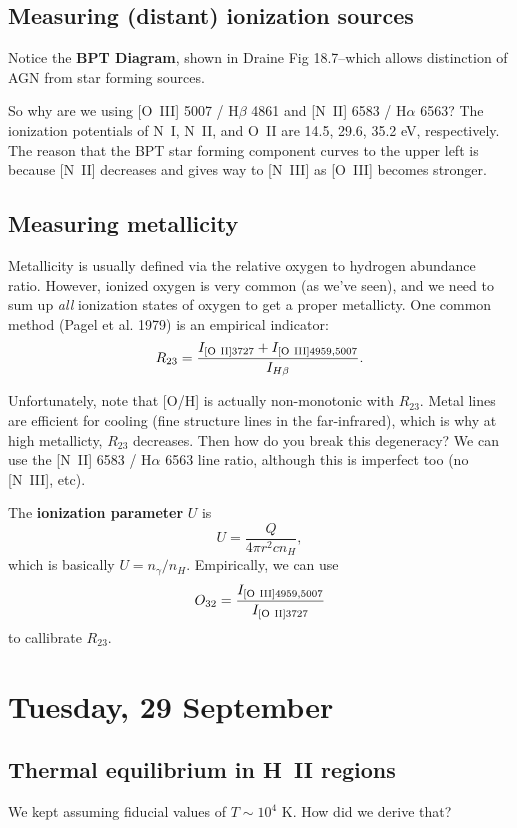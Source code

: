 \documentclass{tufte-handout}
\renewcommand{\textbf}[1]{{\bf \textcolor{dark-gray}{#1}}}
\newcommand{\HII}{\textnormal{H{\smaller~\textsc{II}}}}
\renewcommand{\smallcaps}[1]{{\smaller~\textsc{#1}}}
\newcommand{\spec}[2]{\textnormal{#1}\smallcaps{#2}} %
\begin{document}
\subsection{Measuring (distant) ionization sources}
Notice the \textbf{BPT Diagram}, shown in Draine Fig 18.7--which allows distinction of AGN from star forming sources.

So why are we using [\spec{O}{III}] 5007 / H$\beta$ 4861 and [\spec{N}{II}] 6583 / H$\alpha$ 6563? The ionization potentials of \spec{N}{I}, \spec{N}{II}, and \spec{O}{II} are 14.5, 29.6, 35.2 eV, respectively. The reason that the BPT star forming component curves to the upper left is because [\spec{N}{II}] decreases and gives way to [\spec{N}{III}] as [\spec{O}{III}] becomes stronger.

\subsection{Measuring metallicity}
Metallicity is usually defined via the relative oxygen to hydrogen abundance ratio. However, ionized oxygen is very common (as we've seen), and we need to sum up \textit{all} ionization states of oxygen to get a proper metallicty. One common method (Pagel et al. 1979) is an empirical indicator:
\begin{equation}
R_{23} = \frac{I_{[\spec{O}{II}] 3727} + I_{[\spec{O}{III}] 4959, 5007}}{I_{H \beta}}.
\end{equation}

Unfortunately, note that [O/H] is actually non-monotonic with $R_{23}$. Metal lines are efficient for cooling (fine structure lines in the far-infrared), which is why at high metallicty, $R_{23}$ decreases. 
Then how do you break this degeneracy? We can use the [\spec{N}{II}] 6583 / H$\alpha$ 6563 line ratio, although this is imperfect too (no [\spec{N}{III}], etc).

The \textbf{ionization parameter} $U$ is
\begin{equation}
U = \frac{Q}{4 \pi r^2 c n_H},
\end{equation}
which is basically $U = n_\gamma / n_H$. Empirically, we can use
\[
O_{32} = \frac{I_{[\spec{O}{III}] 4959,5007}}{I_{[\spec{O}{II}] 3727}}
\]
to callibrate $R_{23}$.

\section{Tuesday, 29 September}
\subsection{Thermal equilibrium in \HII{} regions}
We kept assuming fiducial values of $T \sim 10^4$ K. How did we derive that?
\end{document}
